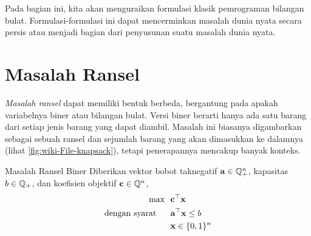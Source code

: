 Pada bagian ini, kita akan menguraikan formulasi klasik pemrograman bilangan bulat. Formulasi-formulasi ini dapat mencerminkan masalah dunia nyata secara persis atau menjadi bagian dari penyusunan suatu masalah dunia nyata.

\section{Masalah Ransel}
\emph{Masalah ransel} dapat memiliki bentuk berbeda, bergantung pada apakah variabelnya biner atau bilangan bulat. Versi biner berarti hanya ada satu barang dari setiap jenis barang yang dapat diambil. Masalah ini biasanya digambarkan sebagai sebuah ransel dan sejumlah barang yang akan dimasukkan ke dalamnya (lihat \autoref{fig:wiki-File-knapsack}), tetapi penerapannya mencakup banyak konteks.




\begin{general}{Masalah Ransel Biner}{\npcomplete}
Diberikan vektor bobot taknegatif $\mathbf{a} \in {\mathbb{Q}}^n_+$, kapasitas $b \in {\mathbb{Q}}_+$, dan koefisien objektif $\mathbf{c} \in {\mathbb{Q}}^n$,
\begin{equation}
\begin{split}
\max \ \ & \mathbf{c}^\top \mathbf{x}\\
\mbox{dengan syarat}\quad \ \ & \mathbf{a}^\top \mathbf{x} \leq b\\
& \mathbf{x} \in \{0,1\}^n
\end{split}
\end{equation}
\end{general}
 


 

